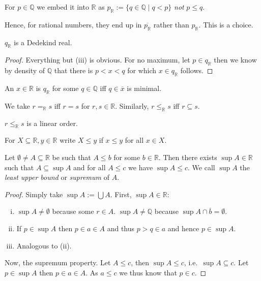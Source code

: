 \documentclass{whrartcl}
\newcommand{\QQ}{\mathbb{Q}}
\newcommand{\RR}{\mathbb{R}}
\newcommand{\ol}[1]{\overline{#1}}
\begin{document}
\begin{example}
  For $p \in \QQ$ we embed it into $\RR$ as $p_\RR := \{q \in \QQ \mid q < p\}$
  \emph{not} $p \leq q$.

  Hence, for rational numbers, they end up in $\ol{p_\RR}$ rather than $p_\RR$.
  This is a choice.
\end{example}

\begin{proposition}
  $q_\RR$ is a Dedekind real.
\end{proposition}
\begin{proof}
  Everything but (iii) is obvious. For no maximum, let $p \in q_\RR$ then we
  know by density of $\QQ$ that there is $p < x < q$ for which $x \in q_\RR$ follows.
\end{proof}

\begin{fact}
  An $x \in \RR$ is $q_\RR$ for some $q \in \QQ$ iff $q \in \ol{x}$ is minimal.
\end{fact}

\begin{definition}
  We take $r =_\RR s$ iff $r = s$ for $r, s \in \RR$. Similarly, $r \leq_\RR s$
  iff $r \subseteq s$.
\end{definition}

\begin{fact}
  $r \leq_\RR s$ is a linear order.
\end{fact}

For $X \subseteq \RR, y \in \RR$ write $X \leq y$ if $x \leq y$ for all $x \in X$.

\begin{theorem}[Completeness]
  Let $\emptyset \neq A \subseteq \RR$ be such that $A \leq b$ for some $b \in \RR$.
  Then there exists $\sup A \in \RR$ such that $A \subseteq \sup A$ and for all
  $A \leq c$ we have $\sup A \leq c$. We call $\sup A$ the \emph{least upper
    bound} or \emph{supremum} of $A$.
\end{theorem}
\begin{proof}
  Simply take $\sup A := \bigcup A$. First, $\sup A \in \RR$:
  \begin{enumerate}[(i)]
  \item $\sup A \neq \emptyset$ because some $r \in A$. $\sup A \neq \QQ$
    because $\sup A \cap \ol{b} = \emptyset$.
  \item If $p \in \sup A$ then $p \in a \in A$ and thus $p > q \in a$ and hence
    $p \in \sup A$.
  \item Analogous to (ii).
  \end{enumerate}

  Now, the supremum property. Let $A \leq c$, then $\sup A \leq c$, i.e.\ $\sup
  A \subseteq c$. Let $p \in \sup A$ then $p \in a \in A$. As $a \leq c$ we thus
  know that $p \in c$.
\end{proof}
\end{document}
